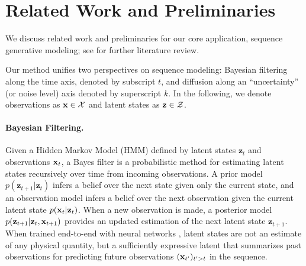 \section{Related Work and Preliminaries}
\label{sec:related_prelim}
We discuss related work and preliminaries for our core application, sequence generative modeling; see  for further literature review.

Our method unifies two perspectives on sequence modeling:  Bayesian filtering along the time axis, denoted by subscript $t$, and diffusion along an ``uncertainty'' (or noise level) axis denoted by superscript $k$. In the following, we denote observations as $\mathbf{x} \in \mathcal{X}$ and latent states as $\mathbf{z} \in \mathcal Z$. 

\paragraph{Bayesian Filtering.}
Given a Hidden Markov Model (HMM) defined by latent states $\mathbf{z}_t$ and observations $\mathbf{x}_t$, a Bayes filter is a probabilistic method for estimating latent states recursively over time from incoming observations. A prior model $p(\mathbf{z}_{t+1}|\mathbf{z}_{t})$ infers a belief over the next state given only the current state, and an observation model infers a belief over the next observation given the current latent state $p(\mathbf{x}_{t}|\mathbf{z}_{t})$. When a new observation is made, a posterior model $p(\mathbf{z}_{t+1}|\mathbf{z}_{t}, \mathbf{x}_{t+1})$ provides an updated estimation of the next latent state $\mathbf{z}_{t+1}$. When trained end-to-end with neural networks \cite{dreamer,planet}, latent states are not an estimate of any physical quantity, but a sufficiently expressive latent that summarizes past observations for predicting future observations $(\mathbf{x}_{t'})_{t'>t}$ in the sequence. 



\newcommand{\eye}{\mathbf{I}}

\newcommand{\bmu}{\bm{\mu}}
\newcommand{\beps}{\bm{\epsilon}}
